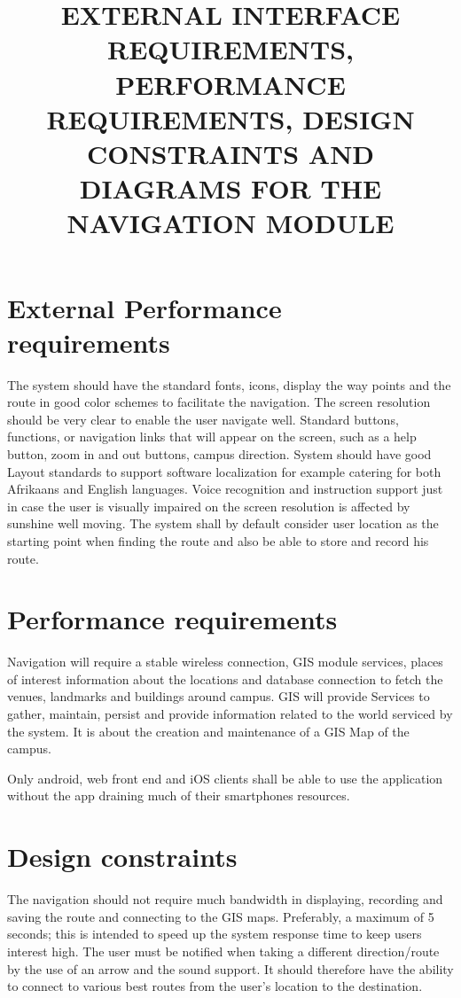 \documentclass[10pt]{article}
\title{EXTERNAL INTERFACE REQUIREMENTS, PERFORMANCE REQUIREMENTS, DESIGN CONSTRAINTS AND DIAGRAMS FOR THE NAVIGATION MODULE}
\begin{document}
\maketitle
\tableofcontents


\section{External Performance requirements}
The system should have the standard fonts, icons, display the way points and the route in good color schemes to facilitate the navigation. The screen resolution should be very clear to enable the user navigate well. Standard buttons, functions, or navigation links that will appear on the screen, such as a help button, zoom in and out buttons, campus direction. System should have good Layout standards to support software localization for example catering for both Afrikaans and English languages. Voice recognition and instruction support just in case the user is visually impaired on the screen resolution is affected by sunshine well moving. The system shall by default consider user location as the starting point when finding the route and also be able to store and record his route.
\section{Performance requirements}
Navigation will require a stable wireless connection, GIS module services, places of interest information about the locations and database connection to fetch the venues, landmarks and buildings around campus. GIS will provide Services to gather, maintain, persist and provide information related to the world serviced by the system. It is about the creation and maintenance of a GIS Map of the campus.

Only android, web front end and iOS clients shall be able to use the application without the app draining much of their smartphones resources. 
\section{Design constraints}
The navigation should not require much bandwidth in displaying, recording and saving the route and connecting to the GIS maps. Preferably, a maximum of 5 seconds; this is intended to speed up the system response time to keep users interest high.   
The user must be notified when taking a different direction/route by the use of an arrow and the sound support. It should therefore have the ability to connect to various best routes from the user's location to the destination.
\end{document}
